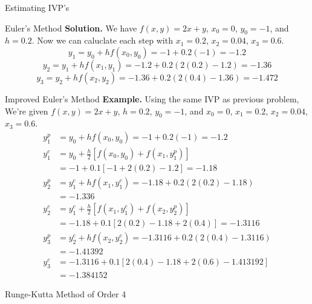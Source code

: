 \documentclass{article}
\begin{document}
\begin{multicols*}{3}
\begin{blackbox}{Estimating IVP's}
\begin{bluebox}{Euler's Method}
            \textbf{Solution.} We have $f(x,y) = 2x + y$, $x_0 = 0$, $y_0 = -1$, and $h = 0.2$. Now we can caluclate each step with $x_1 = 0.2$, $x_2 = 0.04$, $x_3 = 0.6$. 
            {\footnotesize
            \[y_1 = y_0 + h f(x_0,y_0) = -1 + 0.2(-1) = -1.2\]
            \[y_2 = y_1 + hf(x_1,y_1) = -1.2 + 0.2(2(0.2) - 1.2) = -1.36\]
            \[y_3 = y_2 + hf(x_2,y_2) = -1.36 + 0.2(2(0.4) - 1.36) = -1.472\]
            }
        \end{bluebox}
        \begin{brownbox}{Improved Euler's Method}
            \textbf{Example.} Using the same IVP as previous problem,
            We're given $f(x,y) = 2x + y$, $h = 0.2$, $y_0 = -1$, and $x_0 = 0$, $x_1 = 0.2$, $x_2 = 0.04$, $x_3 = 0.6$. 
            {\footnotesize
            \begin{align*}
                y_1^p &= y_0 + h f(x_0, y_0) = -1 + 0.2(-1) = -1.2\\
                y_1^c &= y_0 + \frac{h}{2}\left[f(x_0,y_0) + f(x_1,y_1^p)\right]\\
                      &= -1 + 0.1 \left[-1 + 2(0.2) - 1.2\right] = -1.18\\
                y_2^p &= y_1^c + h f(x_1, y_1^c) = -1.18 + 0.2(2(0.2) - 1.18)\\
                      &= -1.336\\
                y_2^c &= y_1^c + \frac{h}{2}\left[f(x_1,y_1^c) + f(x_2,y_2^p)\right]\\
                      &= -1.18 + 0.1\left[2(0.2) - 1.18 + 2(0.4)\right] = -1.3116\\
                y_3^p &= y_2^c + hf(x_2, y_2^c) = -1.3116 + 0.2(2(0.4) - 1.3116)\\
                      &= -1.41392\\
                y_3^c &= -1.3116 + 0.1\left[2(0.4) - 1.18 + 2(0.6) - 1.413192\right]\\
                      &= -1.384152
            \end{align*}
            }
        \end{brownbox}
        \begin{redbox}{Runge-Kutta Method of Order 4}


\end{redbox}
\end{blackbox}
\end{multicols*}
\end{document}
